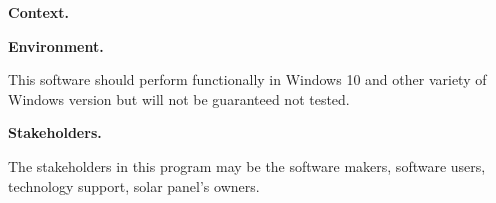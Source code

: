 \documentclass{article}
\begin{document}
\medskip
\medskip

{\Large\textbf  {Context. }}

\medskip

{\textbf  {Environment. }}
\medskip

This software should perform functionally in Windows 10 and other variety of Windows version but will not be guaranteed not tested.

\medskip

{\textbf  {Stakeholders. }}

\medskip

The stakeholders in this program may be the software makers, software users, technology support, solar panel's owners. 

\iffalse Put your problem statement here.  Comments to you can be added, like this:

\wss{comment}

You can also leave comments for yourself, like this:

\an{comment} \fi
\end{document}
